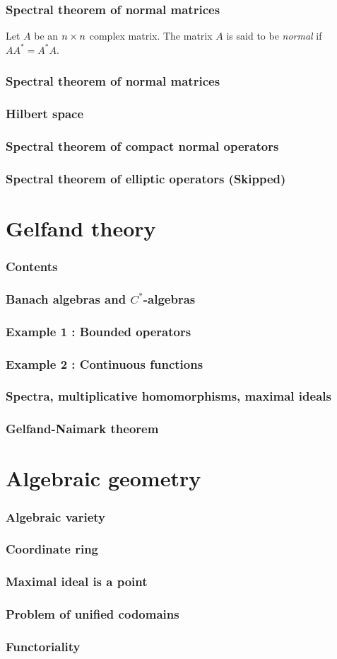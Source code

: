 \documentclass{beamer}
\begin{document}
\begin{frame}
\frametitle{Spectral theorem of normal matrices}
  \begin{defn}
    Let $A$ be an $n\times n$ complex matrix.
    The matrix $A$ is said to be \emph{normal} if $AA^*=A^*A$.
  \end{defn}
\end{frame}

\begin{frame}
\frametitle{Spectral theorem of normal matrices}
\end{frame}

\begin{frame}
\frametitle{Hilbert space}
\end{frame}

\begin{frame}
\frametitle{Spectral theorem of compact normal operators}
\end{frame}

\begin{frame}
\frametitle{Spectral theorem of elliptic operators (Skipped)}
\end{frame}


\section{Gelfand theory}
\begin{frame}
\frametitle{Contents}
  \tableofcontents[currentsection]
\end{frame}

\begin{frame}
\frametitle{Banach algebras and $C^*$-algebras}
\end{frame}
\begin{frame}
\frametitle{Example 1 : Bounded operators}
\end{frame}
\begin{frame}
\frametitle{Example 2 : Continuous functions}
\end{frame}
\begin{frame}
\frametitle{Spectra, multiplicative homomorphisms, maximal ideals}
\end{frame}
\begin{frame}
\frametitle{Gelfand-Naimark theorem}
\end{frame}


\section{Algebraic geometry}
\begin{frame}
\frametitle{Algebraic variety}
\end{frame}
\begin{frame}
\frametitle{Coordinate ring}
\end{frame}
\begin{frame}
\frametitle{Maximal ideal is a point}
\end{frame}
\begin{frame}
\frametitle{Problem of unified codomains}
\end{frame}
\begin{frame}
\frametitle{Functoriality}
\end{frame}
\end{document}
